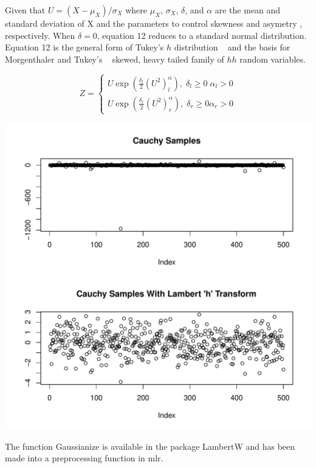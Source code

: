 \documentclass{article}\usepackage[]{graphicx}\usepackage[]{color}
\makeatletter
\def\maxwidth{ %
  \ifdim\Gin@nat@width>\linewidth
    \linewidth
  \else
    \Gin@nat@width
  \fi
}
\newenvironment{knitrout}{}{} %
\theoremstyle{definition}
\newcommand\code{\@codex}
\def\@codex#1{{\normalfont\ttfamily\hyphenchar\font=-1 #1}}
\newcommand{\pkg}[1]{{\fontseries{b}\selectfont #1}}
\makeatother
\begin{document}
Given that $U = (X-\mu_X)/\sigma_X$ where $\mu_X$, $\sigma_X$, $\delta$, and $\alpha$ are the mean and standard deviation of X and the parameters to control skewness and asymetry , respectively. When $\delta = 0$, equation 12 reduces to a standard normal distribution. Equation 12 is the general form of Tukey's $h$ distribution ~\cite{ghdist} and the basis for Morgenthaler and Tukey's ~\cite{hhdist} skewed, heavy tailed family of $hh$ random variables.

\begin{equation}
  Z = \begin{cases}
               U\exp\left(\frac{\delta_l}{2}(U^2)^\alpha_l\right),\; \delta_l \ge 0\; \alpha_l > 0\\
               U\exp\left(\frac{\delta_r}{2}(U^2)^\alpha_r\right),\; \delta_r \ge 0 \alpha_r > 0
            \end{cases}
\end{equation}

\begin{knitrout}
\color{fgcolor}
\includegraphics[width=\maxwidth]{figure/lambertWplots-1} 

\end{knitrout}

The function \code{Gaussianize} is available in the package \pkg{LambertW} and has been made into a preprocessing function in \pkg{mlr}.
\end{document}
